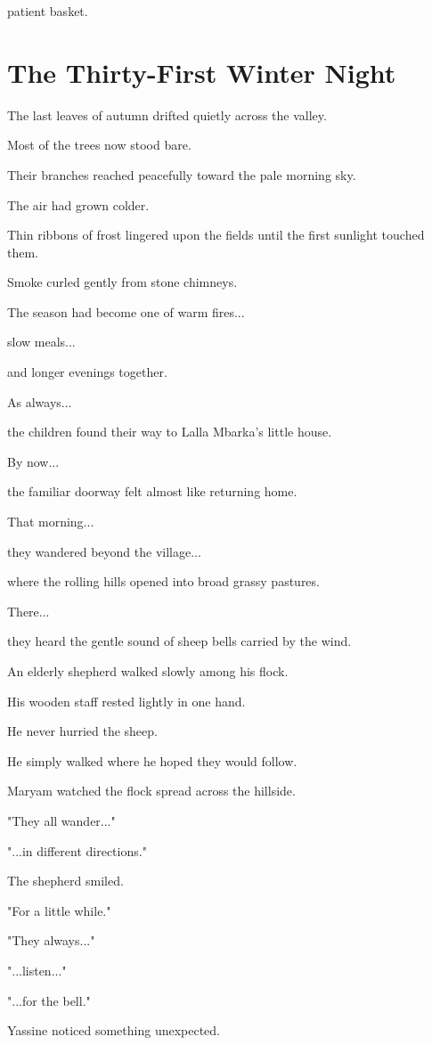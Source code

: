 \documentclass[12pt,openany]{book}
\begin{document}
patient basket.
\chapter{The Thirty-First Winter Night}

The last leaves of autumn drifted quietly across the valley.

Most of the trees now stood bare.

Their branches reached peacefully toward the pale morning sky.

The air had grown colder.

Thin ribbons of frost lingered upon the fields until the first sunlight touched them.

Smoke curled gently from stone chimneys.

The season had become one of warm fires...

slow meals...

and longer evenings together.

As always...

the children found their way to Lalla Mbarka's little house.

By now...

the familiar doorway felt almost like returning home.

That morning...

they wandered beyond the village...

where the rolling hills opened into broad grassy pastures.

There...

they heard the gentle sound of sheep bells carried by the wind.

An elderly shepherd walked slowly among his flock.

His wooden staff rested lightly in one hand.

He never hurried the sheep.

He simply walked where he hoped they would follow.

Maryam watched the flock spread across the hillside.

"They all wander..."

"...in different directions."

The shepherd smiled.

"For a little while."

"They always..."

"...listen..."

"...for the bell."

Yassine noticed something unexpected.
\end{document}
